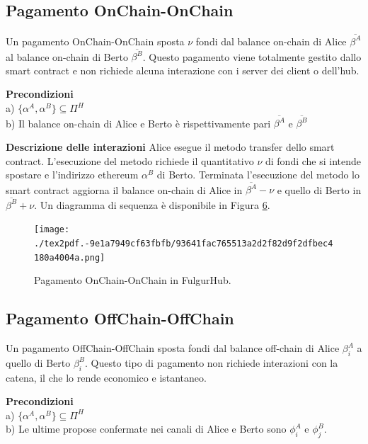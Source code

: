 \documentclass[12pt,italian,]{book}
\begin{document}
\hypertarget{pagamento-onchain-onchain}{%
\subsection{Pagamento OnChain-OnChain}\label{pagamento-onchain-onchain}}

Un pagamento OnChain-OnChain sposta \(\nu\) fondi dal balance on-chain di Alice \(\overline{\beta^A}\) al balance on-chain di Berto \(\overline{\beta^B}\). Questo pagamento viene totalmente gestito dallo smart contract e non richiede alcuna interazione con i server dei client o dell'hub.

\textbf{\textbf{Precondizioni}}\\
a) \(\{\alpha^A, \alpha^B\} \subseteq \Pi^H\)\\
b) Il balance on-chain di Alice e Berto è rispettivamente pari \(\overline{\beta^A}\) e \(\overline{\beta^B}\)

\textbf{\textbf{Descrizione delle interazioni}} Alice esegue il metodo transfer dello smart contract. L'esecuzione del metodo richiede il quantitativo \(\nu\) di fondi che si intende spostare e l'indirizzo ethereum \(\alpha^B\) di Berto. Terminata l'esecuzione del metodo lo smart contract aggiorna il balance on-chain di Alice in \(\overline{\beta^A}-\nu\) e quello di Berto in \(\overline{\beta^B}+\nu\). Un diagramma di sequenza è disponibile in Figura \protect\hyperlink{caso-duso-onchain-onchain}{6}.

\begin{figure}
\centering
\texttt{[image: ./tex2pdf.-9e1a7949cf63fbfb/93641fac765513a2d2f82d9f2dfbec4180a4004a.png]}
\caption{\protect\hypertarget{caso-duso-onchain-onchain}{}{}Pagamento OnChain-OnChain in FulgurHub.}
\end{figure}

\hypertarget{pagamento-offchain-offchain}{%
\subsection{Pagamento OffChain-OffChain}\label{pagamento-offchain-offchain}}

Un pagamento OffChain-OffChain sposta fondi dal balance off-chain di Alice \(\beta^A_i\) a quello di Berto \(\beta^B_i\). Questo tipo di pagamento non richiede interazioni con la catena, il che lo rende economico e istantaneo.

\textbf{\textbf{Precondizioni}}\\
a) \(\{\alpha^A, \alpha^B\} \subseteq \Pi^H\)\\
b) Le ultime propose confermate nei canali di Alice e Berto sono \(\phi^A_i\) e \(\phi^B_j\).
\end{document}
